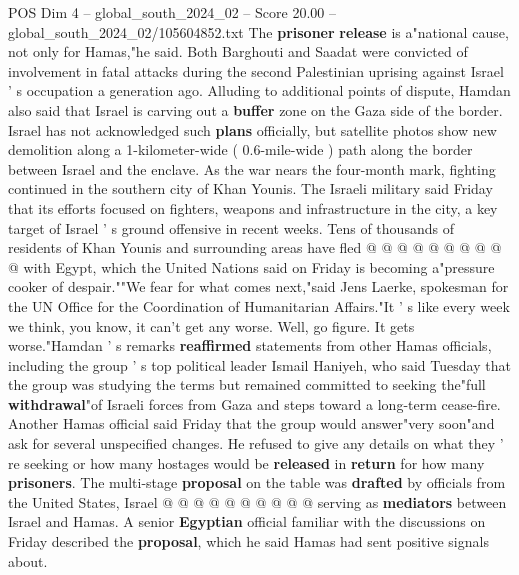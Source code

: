 \begin{textsample}{POS Dim 4 – global\_south\_2024\_02 – Score 20.00 – global\_south\_2024\_02/105604852.txt}
The \textbf{prisoner} \textbf{release} is a"national cause, not only for Hamas,"he said.
Both Barghouti and Saadat were convicted of involvement in fatal attacks during the second Palestinian uprising against Israel ' s occupation a generation ago.
Alluding to additional points of dispute, Hamdan also said that Israel is carving out a \textbf{buffer} zone on the Gaza side of the border.
Israel has not acknowledged such \textbf{plans} officially, but satellite photos show new demolition along a 1-kilometer-wide ( 0.6-mile-wide ) path along the border between Israel and the enclave.
As the war nears the four-month mark, fighting continued in the southern city of Khan Younis.
The Israeli military said Friday that its efforts focused on fighters, weapons and infrastructure in the city, a key target of Israel ' s ground offensive in recent weeks.
Tens of thousands of residents of Khan Younis and surrounding areas have fled @ @ @ @ @ @ @ @ @ @ with Egypt, which the United Nations said on Friday is becoming a"pressure cooker of despair.""We fear for what comes next,"said Jens Laerke, spokesman for the UN Office for the Coordination of Humanitarian Affairs."It ' s like every week we think, you know, it can't get any worse.
Well, go figure.
It gets worse."Hamdan ' s remarks \textbf{reaffirmed} statements from other Hamas officials, including the group ' s top political leader Ismail Haniyeh, who said Tuesday that the group was studying the terms but remained committed to seeking the"full \textbf{withdrawal}"of Israeli forces from Gaza and steps toward a long-term cease-fire.
Another Hamas official said Friday that the group would answer"very soon"and ask for several unspecified changes.
He refused to give any details on what they ' re seeking or how many hostages would be \textbf{released} in \textbf{return} for how many \textbf{prisoners}.
The multi-stage \textbf{proposal} on the table was \textbf{drafted} by officials from the United States, Israel @ @ @ @ @ @ @ @ @ @ serving as \textbf{mediators} between Israel and Hamas.
A senior \textbf{Egyptian} official familiar with the discussions on Friday described the \textbf{proposal}, which he said Hamas had sent positive signals about.

\end{textsample}
